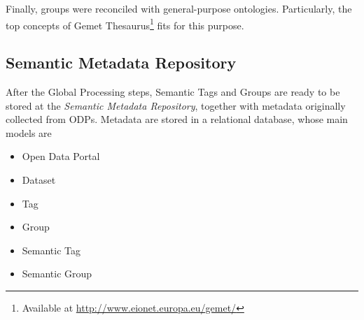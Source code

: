 Finally, groups were reconciled with general-purpose ontologies.
Particularly, the top concepts of Gemet Thesaurus\footnote{Available at \url{http://www.eionet.europa.eu/gemet/}} fits for this purpose.


\subsection{Semantic Metadata Repository}
\label{sec:semantic_metadata_repo}

After the Global Processing steps, Semantic Tags and Groups are ready to be stored at the \emph{Semantic Metadata Repository}, together with metadata originally collected from ODPs.
Metadata are stored in a relational database, whose main models are 

\begin{itemize}
	\item Open Data Portal
	\item Dataset
	\item Tag
	\item Group
	\item Semantic Tag
	\item Semantic Group
\end{itemize}




